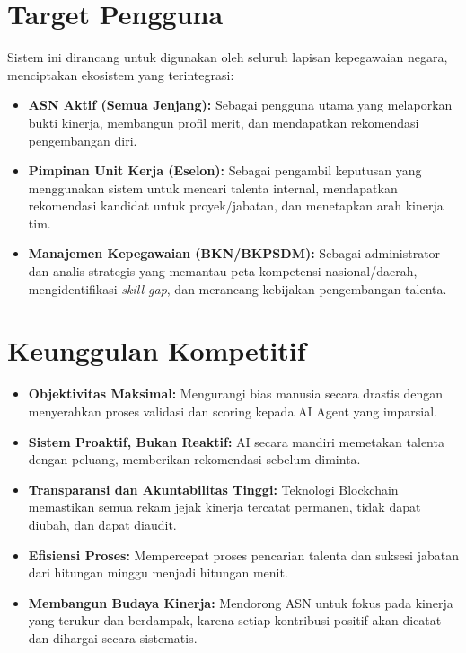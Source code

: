 \documentclass[11pt, a4paper]{article}
\begin{document}
\section{Target Pengguna}
Sistem ini dirancang untuk digunakan oleh seluruh lapisan kepegawaian negara, menciptakan ekosistem yang terintegrasi:
\begin{itemize}
    \item \textbf{ASN Aktif (Semua Jenjang):} Sebagai pengguna utama yang melaporkan bukti kinerja, membangun profil merit, dan mendapatkan rekomendasi pengembangan diri.
    \item \textbf{Pimpinan Unit Kerja (Eselon):} Sebagai pengambil keputusan yang menggunakan sistem untuk mencari talenta internal, mendapatkan rekomendasi kandidat untuk proyek/jabatan, dan menetapkan arah kinerja tim.
    \item \textbf{Manajemen Kepegawaian (BKN/BKPSDM):} Sebagai administrator dan analis strategis yang memantau peta kompetensi nasional/daerah, mengidentifikasi \textit{skill gap}, dan merancang kebijakan pengembangan talenta.
\end{itemize}

\newpage %
\section{Keunggulan Kompetitif}
\begin{itemize}
    \item \textbf{Objektivitas Maksimal:} Mengurangi bias manusia secara drastis dengan menyerahkan proses validasi dan scoring kepada AI Agent yang imparsial.
    \item \textbf{Sistem Proaktif, Bukan Reaktif:} AI secara mandiri memetakan talenta dengan peluang, memberikan rekomendasi sebelum diminta.
    \item \textbf{Transparansi dan Akuntabilitas Tinggi:} Teknologi Blockchain memastikan semua rekam jejak kinerja tercatat permanen, tidak dapat diubah, dan dapat diaudit.
    \item \textbf{Efisiensi Proses:} Mempercepat proses pencarian talenta dan suksesi jabatan dari hitungan minggu menjadi hitungan menit.
    \item \textbf{Membangun Budaya Kinerja:} Mendorong ASN untuk fokus pada kinerja yang terukur dan berdampak, karena setiap kontribusi positif akan dicatat dan dihargai secara sistematis.
\end{itemize}
\end{document}
